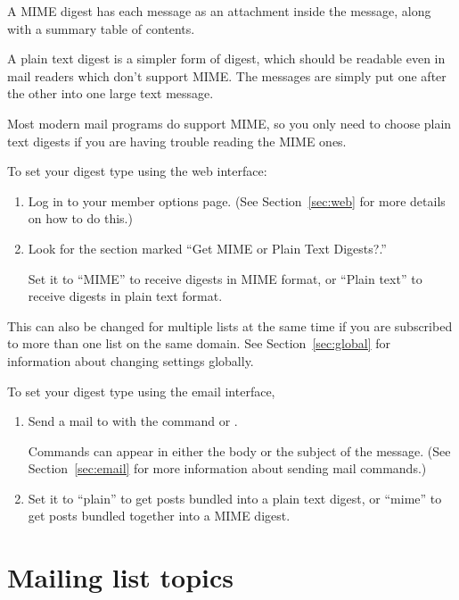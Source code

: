 \documentclass{howto}
\begin{document}
A MIME digest has each message as an attachment inside the message, along
with a summary table of contents.  

A plain text digest is a simpler form of digest, which should be readable 
even in mail readers which don't support MIME.  The messages are simply put 
one after the other into one large text message.

Most modern mail programs do support MIME, so you only need to choose 
plain text digests if you are having trouble reading the MIME ones.


To set your digest type using the web interface:
\begin{enumerate}
   \item Log in to your member options page.  (See Section~\ref{sec:web}
   for more details on how to do this.)
   \item Look for the section marked ``Get MIME or Plain Text Digests?.''

	Set it to ``MIME'' to receive digests in MIME format, or ``Plain text'' to 
	receive digests in plain text format. 
\end{enumerate}

This can also be changed for multiple lists at the same time if you are subscribed to 
more than one list on the same domain.  See Section~\ref{sec:global} for 
information about changing settings globally.

To set your digest type using the email interface,
\begin{enumerate}
   \item Send a mail to  with the command
    or .

   Commands can appear
   in either the body or the subject of the message.  (See
   Section~\ref{sec:email} for more information about sending mail
   commands.)
   \item Set it to ``plain'' to get posts bundled into a plain text digest,
	or ``mime'' to get posts bundled together into a MIME digest.
\end{enumerate}

\section{Mailing list topics\label{sec:topics}}
\end{document}
